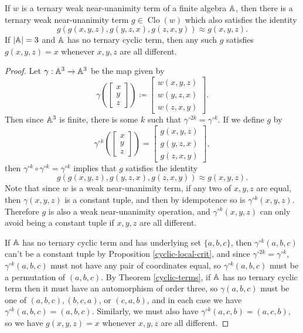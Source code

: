 \documentclass[letterpaper,11pt]{article}
\DeclareMathOperator{\Clo}{Clo}
\begin{document}
\begin{thm}\label{ternary-iteration} If $w$ is a ternary weak near-unanimity term of a finite algebra $\mathbb{A}$, then there is a ternary weak near-unanimity term $g \in \Clo(w)$ which also satisfies the identity
\[
g(g(x,y,z),g(y,z,x),g(z,x,y)) \approx g(x,y,z).
\]
If $|\mathbb{A}| = 3$ and $\mathbb{A}$ has no ternary cyclic term, then any such $g$ satisfies $g(x,y,z) = x$ whenever $x,y,z$ are all different.
\end{thm}
\begin{proof} Let $\gamma : \mathbb{A}^3 \rightarrow \mathbb{A}^3$ be the map given by
\[
\gamma\left(\begin{bmatrix}x\\ y\\ z\end{bmatrix}\right) \coloneqq \begin{bmatrix}w(x,y,z)\\ w(y,z,x)\\ w(z,x,y)\end{bmatrix}.
\]
Then since $\mathbb{A}^3$ is finite, there is some $k$ such that $\gamma^{\circ 2k} = \gamma^{\circ k}$. If we define $g$ by
\[
\gamma^{\circ k}\left(\begin{bmatrix}x\\ y\\ z\end{bmatrix}\right) = \begin{bmatrix}g(x,y,z)\\ g(y,z,x)\\ g(z,x,y)\end{bmatrix},
\]
then $\gamma^{\circ k} \circ \gamma^{\circ k} = \gamma^{\circ k}$ implies that $g$ satisfies the identity
\[
g(g(x,y,z),g(y,z,x),g(z,x,y)) \approx g(x,y,z).
\]
Note that since $w$ is a weak near-unanimity term, if any two of $x,y,z$ are equal, then $\gamma(x,y,z)$ is a constant tuple, and then by idempotence so is $\gamma^{\circ k}(x,y,z)$. Therefore $g$ is also a weak near-unanimity operation, and $\gamma^{\circ k}(x,y,z)$ can only avoid being a constant tuple if $x,y,z$ are all different.

If $\mathbb{A}$ has no ternary cyclic term and has underlying set $\{a,b,c\}$, then $\gamma^{\circ k}(a,b,c)$ can't be a constant tuple by Proposition \ref{cyclic-local-crit}, and since $\gamma^{\circ 2k} = \gamma^{\circ k}$, $\gamma^{\circ k}(a,b,c)$ must not have any pair of coordinates equal, so $\gamma^{\circ k}(a,b,c)$ must be a permutation of $(a,b,c)$. By Theorem \ref{cyclic-terms}, if $\mathbb{A}$ has no ternary cyclic term then it must have an automorphism of order three, so $\gamma(a,b,c)$ must be one of $(a,b,c), (b,c,a)$, or $(c,a,b)$, and in each case we have $\gamma^{\circ k}(a,b,c) = (a,b,c)$. Similarly, we must also have $\gamma^{\circ k}(a,c,b) = (a,c,b)$, so we have $g(x,y,z) = x$ whenever $x,y,z$ are all different.
\end{proof}
\end{document}
